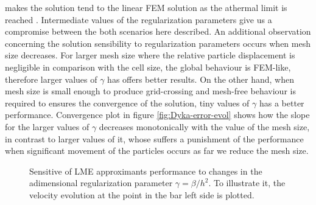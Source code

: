makes the solution tend to the linear FEM solution as the athermal
limit is reached \cite{Arroyo2006}. Intermediate values of the
regularization parameters give us a compromise between the both
scenarios here described. An additional observation concerning the
solution sensibility to regularization parameters occurs when mesh
size decreases. For larger mesh size where the relative particle displacement
is negligible in comparison with the cell size, the global behaviour
is FEM-like, therefore larger values of $\gamma$ has offers better
results. On the other hand, when mesh size is small enough to produce
grid-crossing and mesh-free behaviour is required to ensures the
convergence of the solution, tiny values of $\gamma$ has a better
performance. Convergence plot in figure \eqref{fig:Dyka-error-evol}
shows how the slope for the larger values of $\gamma$ decreases
monotonically with the value of the mesh size, in contrast to larger
values of it, whose suffers a punishment of the performance when significant
movement of the particles occurs as far we reduce the mesh size.  
\begin{figure}\sidecaption
  \centering
  \caption{Sensitive of LME approximants performance to changes in the
    adimensional regularization parameter $\gamma = \beta/h^2$. To
    illustrate it, the velocity evolution at the point in the bar left side
    is plotted.}
  \label{fig:Dyka-LME-gamma}
\end{figure}
